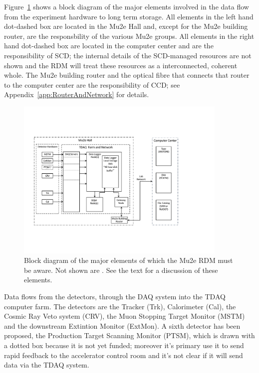 Figure~\ref{fig:blockdiagram} shows a block diagram of the major elements involved
in the data flow from the experiment hardware to long term storage.
All elements in the left hand dot-dashed box are located in the Mu2e Hall
and, except for the Mu2e building router, are the responsbility of the various Mu2e groups.
All elements in the right hand dot-dashed box are located in the computer center
and are the responsibility of SCD; the internal details of the SCD-managed resources
are not shown and the RDM will treat these resources as a interconnected, coherent whole.
The Mu2e building router and the optical fibre that connects that router
to the computer center are the responsibility of CCD;
see Appendix~\ref{app:RouterAndNetwork} for details.

\begin{figure}[tbp]
\centering
\includegraphics[width=0.9\textwidth]{figures/interface_with_TDAQ.pdf}
\caption{Block diagram of the major elements of which the Mu2e RDM must be
  aware. Not shown are .  See the text for a discussion of these elements.}
\label{fig:blockdiagram}
\end{figure}

Data flows from the detectors, through the DAQ system into the TDAQ computer farm.
The detectors are the Tracker (Trk), Calorimeter (Cal), the Cosmic Ray Veto system (CRV),
the Muon Stopping Target Monitor (MSTM) and the downstream Extintion Monitor (ExtMon).
A sixth detector has been proposed, the Production Target Scanning Monitor (PTSM), which is
drawn with a dotted box because it is not yet funded; moreover it's primary use it to send
rapid feedback to the accelerator control room and it's not clear if it will send data
via the TDAQ system.

